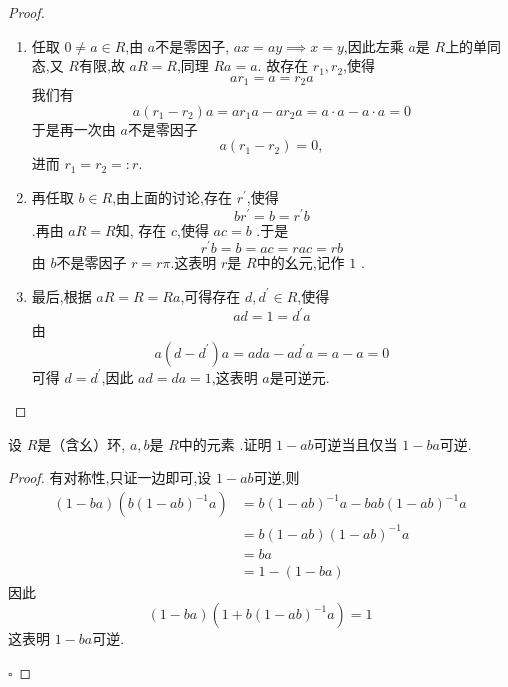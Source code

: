 \documentclass[lang=cn,12pt,color=green,fontset=none,pad]{elegantbook}
\begin{document}
\begin{problemset}
\begin{proof}
        \begin{enumerate}
            \item  任取 \(  0 \neq  a \in R  \),由 \(  a  \)不是零因子, \(  ax= ay \implies x =  y  \),因此左乘 \(  a  \)是 \(  R  \)上的单同态,又 \(  R  \)有限,故 \(  aR = R  \),同理 \(  Ra = a  \).
            故存在 \(  r_1,r_2  \),使得  \[
            ar_1= a= r_2a
            \] 我们有 \[
            a\left( r_1-r_2 \right)a =  ar_1a - ar_2a =  a \cdot a-a\cdot a =  0 
            \] 于是再一次由 \(  a  \)不是零因子 \[
            a\left( r_1-r_2 \right)= 0 ,
            \]进而 \(  r_1= r_2 =: r \).
            \item 再任取 \(  b \in R  \),由上面的讨论,存在 \(  r^{\prime}   \),使得 \[
                br^{\prime} = b=  r^{\prime} b
                \].再由 \(  aR =  R  \)知,  存在 \(  c  \),使得 \(  ac =  b  \)   .于是 \[
                 r^{\prime} b =  b =  ac =  rac =  rb 
                \]由 \(  b  \)不是零因子 \(  r =  r\pi   \).这表明 \(  r  \)是 \(  R  \)中的幺元,记作 \(  1  \) .   

            \item 最后,根据 \(  aR= R= Ra  \),可得存在 \(  d,d^{\prime}  \in R  \),使得 \[
            ad =  1 =  d^{\prime} a
            \]  由 \[
            a\left( d-d^{\prime}  \right)a =  ada -ad^{\prime} a = a-a =  0 
            \]可得 \(  d =  d^{\prime}   \),因此 \(  ad =  da  = 1 \),这表明 \(  a  \)是可逆元.   
        \end{enumerate}
    \end{proof}

    \item 设 \(  R  \)是（含幺）环, \(  a,b  \)是 \(  R  \)中的元素 .证明 \(  1-ab  \)可逆当且仅当 \(  1-ba  \)可逆.    
    \begin{proof}
         有对称性,只证一边即可,设 \(  1-ab  \)可逆,则 \[
         \begin{aligned}
         \left( 1-ba \right)\left( b\left( 1-ab \right)^{-1} a  \right)& =  b\left( 1-ab \right)^{-1} a- bab \left( 1-ab \right)^{-1} a\\ 
          & =  b \left( 1-ab \right)\left( 1-ab \right)^{-1} a\\ 
           & =  ba\\ 
            & = 1-\left( 1-ba \right)        
         \end{aligned}
         \] 因此 \[
         \left( 1-ba \right)\left( 1+ b\left( 1-ab \right)^{-1} a  \right)= 1  
         \]这表明 \(  1-ba  \)可逆. 
    
        \hfill $\square$
    \end{proof}
\end{problemset}
\end{document}
